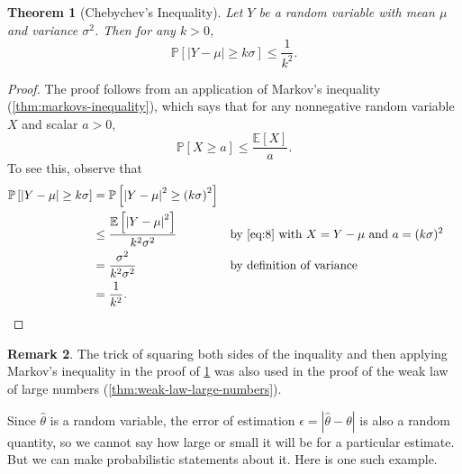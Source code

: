 \documentclass[10pt]{article}
\newtheorem{theorem}{Theorem}
\theoremstyle{definition}
\newtheorem{remark}[theorem]{Remark}
\newcommand{\1}[1]{\textbf{1}_{\left[#1\right]}} %
\def\E{\mathbb{E}} %
\def\P{\mathbb{P}} %
\begin{document}
\begin{theorem}[Chebychev's Inequality]
  \label{thm:chebychevs-inequality}
  Let $Y$ be a random variable with mean $\mu$ and variance $\sigma^{2}$. Then
  for any $k>0$,
  \begin{equation*}
    \P\left[\left| Y-\mu \right| \geq k\sigma\right] \leq \frac{1}{k^{2}}.
  \end{equation*}
\end{theorem}
\begin{proof}
  The proof follows from an application of Markov's inequality
  (\cref{thm:markovs-inequality}), which says that for any nonnegative random
  variable $X$ and scalar $a>0$,
  \begin{equation}\label{eq:8}
    \P\left[X \geq a \right] \leq \frac{ \E\left[X \right]}{a}.
  \end{equation}
  To see this, observe that
  \begin{align*}
    \P\left[\left| Y-\mu \right| \geq k\sigma\right]
    &= \P\left[\left| Y-\mu \right|^{2} \geq \left( k\sigma \right)^{2} \right]\\
    &\leq \frac{\E\left[\left| Y-\mu
      \right|^{2}\right]}{k^{2}\sigma^{2}}&&\text{by \cref{eq:8} with
                                             $X=Y-\mu$ and $a=(k\sigma)^{2}$ }\\
    &= \frac{\sigma^{2}}{k^{2}\sigma^{2}} &&\text{by definition of variance}\\
    &= \frac{1}{k^{2}}.
  \end{align*}
\end{proof}
\begin{remark}
  The trick of squaring both sides of the inquality and then applying Markov's
  inequality in the proof of \cref{thm:chebychevs-inequality} was also used in
  the proof of the weak law of large numbers
  (\cref{thm:weak-law-large-numbers}).
\end{remark}
Since $\widehat{\theta}$ is a random variable, the error of estimation
$\epsilon=|\widehat{\theta}-\theta|$ is also a random quantity, so we cannot say
how large or small it will be for a particular estimate. But we can make
probabilistic statements about it.  Here is one such example.
\end{document}
